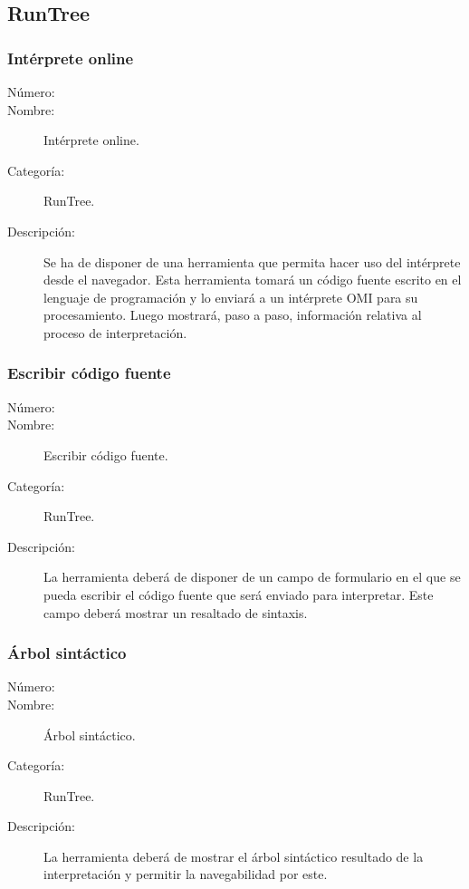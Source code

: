 \subsection{RunTree}

\subsubsection{Intérprete online}
\begin{framed}
	\begin{description}
		\item [Número:] \cn
		\item [Nombre:] Intérprete online.
		\item [Categoría:] RunTree.
		\item [Descripción:] Se ha de disponer de una herramienta que permita
      hacer uso del intérprete desde el navegador. Esta herramienta tomará un código fuente 
      escrito en el lenguaje de programación y lo enviará a un intérprete OMI para su procesamiento. 
      Luego mostrará, paso a paso, información relativa al proceso de interpretación.
	\end {description}
\end{framed}

\subsubsection{Escribir código fuente}
\begin{framed}
	\begin{description}
		\item [Número:] \cn
		\item [Nombre:] Escribir código fuente.
		\item [Categoría:] RunTree.
		\item [Descripción:] La herramienta deberá de disponer de un campo de formulario en el que se pueda escribir el código fuente
      que será enviado para interpretar. Este campo deberá mostrar un resaltado de sintaxis.
	\end {description}
\end{framed}

\subsubsection{Árbol sintáctico}
\begin{framed}
	\begin{description}
		\item [Número:] \cn
		\item [Nombre:] Árbol sintáctico.
		\item [Categoría:] RunTree.
		\item [Descripción:] La herramienta deberá de mostrar el árbol sintáctico resultado de la interpretación y permitir la navegabilidad por este.
	\end {description}
\end{framed}

